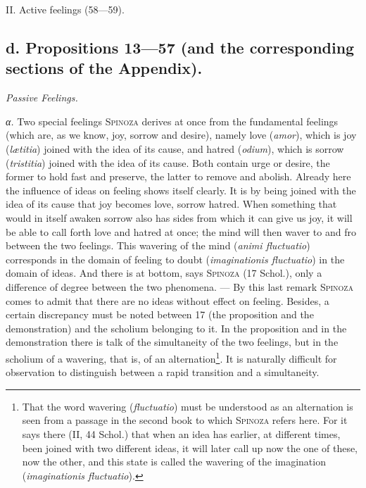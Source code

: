 \documentclass[12pt]{article}
\begin{document}
II. Active feelings (58---59).

\subsection*{d. Propositions 13---57 (and the corresponding sections of the Appendix).}
\begin{center}\textit{Passive Feelings.}\end{center}

\textit{α.} Two special feelings \textsc{Spinoza} derives at once from the fundamental feelings
(which are, as we know, joy, sorrow and desire), namely love (\textit{amor}), which is joy
(\textit{lætitia}) joined with the idea of its cause, and hatred (\textit{odium}), which is sorrow
(\textit{tristitia}) joined with the idea of its cause. Both contain urge or desire, the former
to hold fast and preserve, the latter to remove and abolish. Already here the influence of ideas
on feeling shows itself clearly. It is by being joined with the idea of its cause that joy becomes
love, sorrow hatred. When something that would in itself awaken sorrow also has sides from which
it can give us joy, it will be able to call forth love and hatred at once; the mind will then
waver to and fro between the two feelings. This wavering of the mind (\textit{animi
fluctuatio}) corresponds in the domain of feeling to doubt (\textit{imaginationis fluctuatio}) in
the domain of ideas. And there is at bottom, says \textsc{Spinoza} (17 Schol.), only a difference
of degree between the two phenomena. --- By this last remark \textsc{Spinoza} comes to admit that
there are no ideas without effect on feeling. Besides, a certain discrepancy must be noted between
17 (the proposition and the demonstration) and the scholium belonging to it. In the proposition and
in the demonstration there is talk of the simultaneity of the two feelings, but in the scholium of
a wavering, that is, of an alternation\footnote{That the word wavering (\textit{fluctuatio}) must
be understood as an alternation is seen from a passage in the second book to which
\textsc{Spinoza} refers here. For it says there (II, 44 Schol.) that when an idea has earlier,
at different times, been joined with two different ideas, it will later call up now the one of
these, now the other, and this state is called the wavering of the imagination
(\textit{imaginationis fluctuatio}).}. It is naturally difficult for observation to distinguish
between a rapid transition and a simultaneity.
\end{document}
